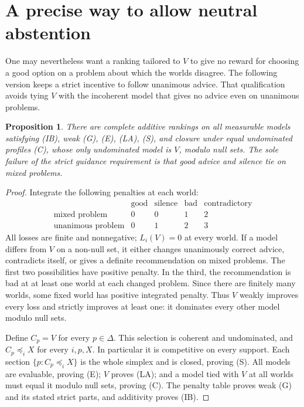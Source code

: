 \documentclass[11pt]{article}
\newtheorem{proposition}{Proposition}
\theoremstyle{remark}\newtheorem{remark}[proposition]{Remark}
\begin{document}
\section{A precise way to allow neutral abstention}

One may nevertheless want a ranking tailored to $V$ to give no reward
for choosing a good option on a problem about which the worlds disagree.
The following version keeps a strict incentive to follow unanimous
advice. That qualification avoids tying $V$ with the incoherent model
that gives no advice even on unanimous problems.

\begin{proposition}\label{prop:neutral}
There are complete additive rankings on all measurable models satisfying
(IB), weak (G), (E), (LA), (S), and closure under equal undominated
profiles (C), whose only undominated model is $V$, modulo null sets.
The sole failure of the strict guidance requirement is that good advice
and silence tie on mixed problems.
\end{proposition}
\begin{proof}
Integrate the following penalties at each world:
\[
 \begin{array}{c|cccc}
 &\text{good}&\text{silence}&\text{bad}&\text{contradictory}\\
 \hline
 \text{mixed problem}&0&0&1&2\\
 \text{unanimous problem}&0&1&2&3
 \end{array}
\]
All losses are finite and nonnegative; $L_i(V)=0$ at every world.
If a model differs from $V$ on a non-null set, it either changes
unanimously correct advice, contradicts itself, or gives a definite
recommendation on mixed problems. The first two possibilities have
positive penalty. In the third, the recommendation is bad at at least
one world at each changed problem. Since there are finitely many worlds,
some fixed world has positive integrated penalty. Thus $V$ weakly
improves every loss and strictly improves at least one: it dominates
every other model modulo null sets.

Define $C_p=V$ for every $p\in\Delta$. This selection is coherent and
undominated, and $C_p\preceq_iX$ for every $i,p,X$. In particular it is
competitive on every support. Each section
$\{p:C_p\preceq_iX\}$ is the whole simplex and is closed, proving (S).
All models are evaluable, proving (E); $V$ proves (LA); and a model tied
with $V$ at all worlds must equal it modulo null sets, proving (C).
The penalty table proves weak (G) and its stated strict parts, and
additivity proves (IB).
\end{proof}
\end{document}
